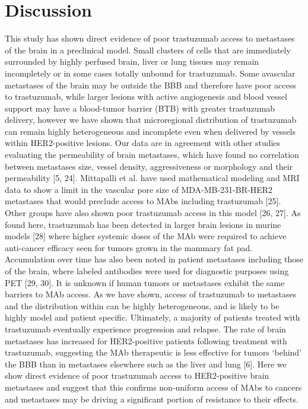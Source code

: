 \section{Discussion}

This study has shown direct evidence of poor trastuzumab access to metastases of the brain in a preclinical model.
Small clusters of cells that are immediately surrounded by highly perfused brain, liver or lung tissues may remain incompletely or in some cases totally unbound for trastuzumab.
Some avascular metastases of the brain may be outside the BBB and therefore have poor access to trastuzumab, while larger lesions with active angiogenesis and blood vessel support may have a blood-tumor barrier (BTB) with greater trastuzumab delivery, however we have shown that microregional distribution of trastuzumab can remain highly heterogeneous and incomplete even when delivered by vessels within HER2-positive lesions.
Our data are in agreement with other studies evaluating the permeability of brain metastases, which have found no correlation between metastases size, vessel density, aggressiveness or morphology and their permeability [5, 24].
Mittapalli et al. have used mathematical modeling and MRI data to show a limit in the vascular pore size of MDA-MB-231-BR-HER2 metastases that would preclude access to MAbs including trastuzumab [25].
Other groups have also shown poor trastuzumab access in this model [26, 27].
As found here, trastuzumab has been detected in larger brain lesions in murine models [28] where higher systemic doses of the MAb were required to achieve anti-cancer efficacy seen for tumors grown in the mammary fat pad.
Accumulation over time has also been noted in patient metastases including those of the brain, where labeled antibodies were used for diagnostic purposes using PET [29, 30].
It is unknown if human tumors or metastases exhibit the same barriers to MAb access.
As we have shown, access of trastuzumab to metastases and the distribution within can be highly heterogeneous, and is likely to be highly model and patient specific.
Ultimately, a majority of patients treated with trastuzumab eventually experience progression and relapse.
The rate of brain metastases has increased for HER2-positive patients following treatment with trastuzumab, suggesting the MAb therapeutic is less effective for tumors `behind' the BBB than in metastases elsewhere such as the liver and lung [6].
Here we show direct evidence of poor trastuzumab access to HER2-positive brain metastases and suggest that this confirms non-uniform access of MAbs to cancers and metastases may be driving a significant portion of resistance to their effects.

